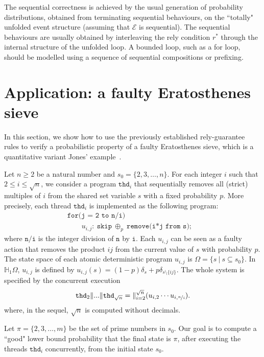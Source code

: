 \documentclass[review]{elsart}
\renewcommand{\H}{\mathbb{H}}
\newcommand{\EE}{\mathcal{E}}
\newcommand{\pc}[1]{{\oplus_{\!#1}}}
\newcommand{\bks}{*}
\newcommand{\thread}{\mathtt{thd}}
\begin{document}
The sequential correctness is achieved by the usual generation of probability distributions, obtained from terminating sequential behaviours, on the ``totally" unfolded event structure (assuming that $\EE$ is sequential). The sequential behaviours are usually obtained by interleaving the rely condition $r^{\bks}$ through the internal structure of the unfolded loop. A bounded loop, such as a for loop, should be modelled using a sequence of sequential compositions or prefixing.

\section{Application: a faulty Eratosthenes sieve}\label{sec:application}

In this section, we show how to use the previously established rely-guarantee rules to verify a probabilistic property of a faulty Eratosthenes sieve, which is a quantitative variant Jones' example~\cite{Jon81}.

Let $n\geq 2$ be a natural number and $s_0 = \{2,3,\dots,n\}$. For each integer $i$ such that $2\leq i\leq \sqrt n$, we consider a program $\thread_i$ that sequentially removes all (strict) multiples of $i$ from the shared set variable $s$ with a fixed probability $p$. More precisely, each thread $\thread_i$ is implemented as the following program: 
\[
	\begin{array}{lc}
		\texttt{for(j = 2 to n/i)} &  \\
		\qquad u_{i,j}:\  \texttt{skip}\ \pc{p}\ \texttt{remove(i*j from s)};&
	\end{array}
\]
where $\texttt{n/i}$ is the integer division of $\texttt{n}$ by $\texttt{i}$. Each $u_{i,j}$ can be seen as a faulty action that removes the product ${ij}$ from the current value of $s$ with probability $p$. The state space of each atomic deterministic program $u_{i,j}$ is $\Omega = \{ s\ |\ s{\subseteq} s_0\}$. In $\H_1\Omega$, $u_{i,j}$ is defined by $u_{i,j}(s) = (1{-}p)\delta_s {+} p\delta_{s{\setminus}\{ij\}}$. 
The whole system is specified by the concurrent execution 
\[
	\thread_2\| ... \|\thread_{\sqrt n}= \|_{i=2}^{\sqrt n}(u_{i,2}\cdots u_{i,\nicefrac{n}{i}}).
\]
where, in the sequel, $\sqrt n$ is computed without decimals.

Let  $\pi {=} \{2,3,\dots, m\}$  be the set of prime numbers in $s_0$. Our goal is to compute a ``good" lower bound probability that the final state is $\pi$, after executing the threads $\thread_i$ concurrently, from the initial state $s_0$.
\end{document}
